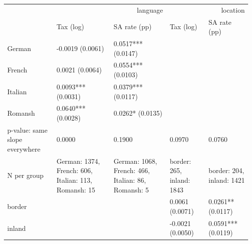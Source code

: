 \begin{tabular}{lllll}
\toprule
 & \multicolumn{2}{r}{language} & \multicolumn{2}{r}{location} \\
 & Tax (log) & SA rate (pp) & Tax (log) & SA rate (pp) \\
\midrule
German & -0.0019 (0.0061) & 0.0517*** (0.0147) &  &  \\
French & 0.0021 (0.0064) & 0.0554*** (0.0103) &  &  \\
Italian & 0.0093*** (0.0031) & 0.0379*** (0.0117) &  &  \\
Romansh & 0.0640*** (0.0028) & 0.0262* (0.0135) &  &  \\
p-value: same slope everywhere & 0.0000 & 0.1900 & 0.0970 & 0.0760 \\
N per group & German: 1374, French: 606, Italian: 113, Romansh: 15 & German: 1068, French: 466, Italian: 86, Romansh: 5 & border: 265, inland: 1843 & border: 204, inland: 1421 \\
border &  &  & 0.0061 (0.0071) & 0.0261** (0.0117) \\
inland &  &  & -0.0021 (0.0050) & 0.0591*** (0.0119) \\
\bottomrule
\end{tabular}
